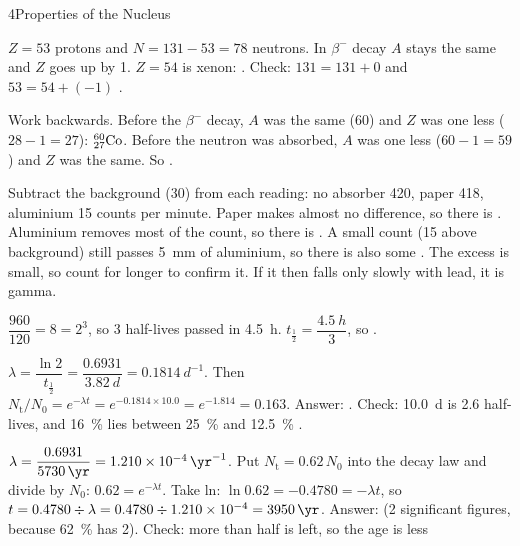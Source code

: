 \begin{chapteranswers}{4}{Properties of the Nucleus}
  \item $Z = 53$ protons and $N = 131 - 53 = 78$ neutrons. In $\beta^-$ decay $A$ stays
        the same and $Z$ goes up by 1. $Z = 54$ is xenon:
        .
        Check: $131 = 131 + 0$ and $53 = 54 + (-1)$ \cmark.
  \item Work backwards. Before the $\beta^-$ decay, $A$ was the same (60) and $Z$ was
        one less ($28 - 1 = 27$): $\chFourNuc{60}{27}{Co}$. Before the neutron was
        absorbed, $A$ was one less ($60 - 1 = 59$) and $Z$ was the same.
        So .
  \item Subtract the background (30) from each reading: no absorber 420, paper 418,
        aluminium 15 counts per minute. Paper makes almost no difference, so there is
        . Aluminium removes most of the count, so there is
        . A small count (15 above background) still passes \qty{5}{mm} of
        aluminium, so there is also some . The excess is small, so count
        for longer to confirm it. If it then falls only slowly with lead, it is gamma.
  \item $\dfrac{960}{120} = 8 = 2^3$, so 3 half-lives passed in \qty{4.5}{h}.
        $t_{\frac{1}{2}} = \dfrac{\qty{4.5}{h}}{3}$, so
        .
  \item $\lambda = \dfrac{\ln 2}{t_{\frac{1}{2}}} = \dfrac{0.6931}{\qty{3.82}{d}}
        = \qty{0.1814}{d^{-1}}$. Then
        $N_\mathrm{t}/N_0 = e^{-\lambda t} = e^{-0.1814 \times 10.0} = e^{-1.814}
        = 0.163$. Answer: . Check: \qty{10.0}{d} is
        2.6 half-lives, and \qty{16}{\percent} lies between \qty{25}{\percent} and
        \qty{12.5}{\percent} \cmark.
  \item $\lambda = \dfrac{0.6931}{\qty{5730}{\yr}} = \qty{1.210e-4}{\yr^{-1}}$.
        Put $N_\mathrm{t} = 0.62\,N_0$ into the decay law and divide by $N_0$:
        $0.62 = e^{-\lambda t}$. Take ln: $\ln 0.62 = -0.4780 = -\lambda t$, so
        $t = 0.4780 \div \lambda = 0.4780 \div \num{1.210e-4} = \qty{3950}{\yr}$.
        Answer:  (2 significant figures, because
        \qty{62}{\percent} has 2). Check: more than half is left, so the age is less

\end{chapteranswers}
